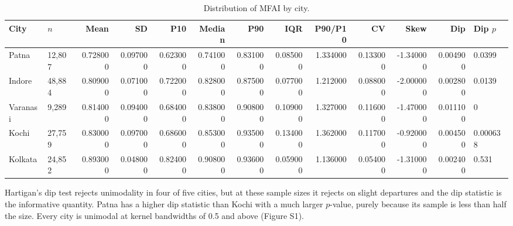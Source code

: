 \begin{table}[htbp]
\centering
\small
\caption{Distribution of MFAI by city.}
\label{tab:t8_distribution}
\begin{tabular}{llrrrrrrrrrrl}
\toprule
City & $n$ & Mean & SD & P10 & Median & P90 & IQR & P90/P10 & CV & Skew & Dip & Dip $p$ \\
\midrule
Patna & 12,807 & 0.728000 & 0.097000 & 0.623000 & 0.741000 & 0.831000 & 0.085000 & 1.334000 & 0.133000 & -1.340000 & 0.004900 & 0.0399 \\
Indore & 48,884 & 0.809000 & 0.071000 & 0.722000 & 0.828000 & 0.875000 & 0.077000 & 1.212000 & 0.088000 & -2.000000 & 0.002800 & 0.0139 \\
Varanasi & 9,289 & 0.814000 & 0.094000 & 0.684000 & 0.838000 & 0.908000 & 0.109000 & 1.327000 & 0.116000 & -1.470000 & 0.011100 & 0 \\
Kochi & 27,759 & 0.830000 & 0.097000 & 0.686000 & 0.853000 & 0.935000 & 0.134000 & 1.362000 & 0.117000 & -0.920000 & 0.004500 & 0.000638 \\
Kolkata & 24,852 & 0.893000 & 0.048000 & 0.824000 & 0.908000 & 0.936000 & 0.059000 & 1.136000 & 0.054000 & -1.310000 & 0.002400 & 0.531 \\
\bottomrule
\end{tabular}
\begin{tablenotes}\footnotesize
\item Hartigan's dip test rejects unimodality in four of five cities, but at these sample sizes it rejects on slight departures and the dip statistic is the informative quantity. Patna has a higher dip statistic than Kochi with a much larger $p$-value, purely because its sample is less than half the size. Every city is unimodal at kernel bandwidths of 0.5 and above (Figure S1).
\end{tablenotes}
\end{table}
